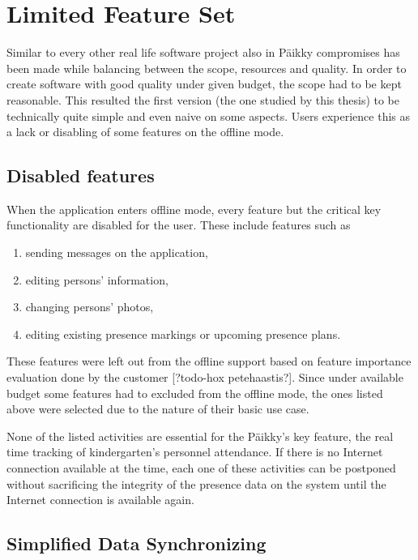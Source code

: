 \section{Limited Feature Set}
Similar to every other real life software project also in Päikky compromises has been made while balancing between the scope, resources and quality. In order to create software with good quality under given budget, the scope had to be kept reasonable. This resulted the first version (the one studied by this thesis) to be technically quite simple and even naive on some aspects. Users experience this as a lack or disabling of some features on the offline mode.




\subsection{Disabled features}
When the application enters offline mode, every feature but the critical key functionality are disabled for the user. These include features such as

\begin{enumerate}
    \item sending messages on the application,
    \item editing persons' information,
    \item changing persons' photos,
    \item editing existing presence markings or upcoming presence plans.
\end{enumerate}

These features were left out from the offline support based on feature importance evaluation done by the customer [?todo-hox petehaastis?]. Since under available budget some features had to excluded from the offline mode, the ones listed above were selected due to the nature of their basic use case.

None of the listed activities are essential for the Päikky's key feature, the real time tracking of kindergarten's personnel attendance. If there is no Internet connection available at the time, each one of these activities can be postponed without sacrificing the integrity of the presence data on the system until the Internet connection is available again.




\subsection{Simplified Data Synchronizing}






